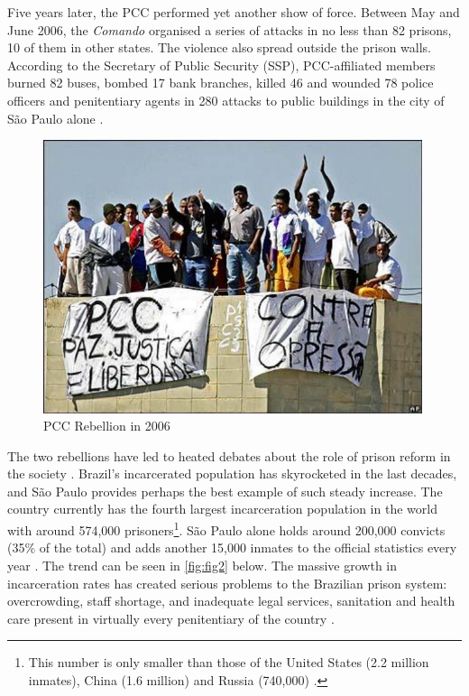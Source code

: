 Five years later, the PCC performed yet another show of force. Between May and June 2006, the \textit{Comando} organised a series of attacks in no less than 82 prisons, 10 of them in other states. The violence also spread outside the prison walls. According to the Secretary of Public Security (SSP), PCC-affiliated members burned 82 buses, bombed 17 bank branches, killed 46 and wounded 78 police officers and penitentiary agents in 280 attacks to public buildings in the city of S\~{a}o Paulo alone \citep[]{folha2006rebeliao, terra2008rebeliao}. 

\begin{center}
\begin{figure}[bth]
\includegraphics[height = 8cm, width = 1\linewidth]{gfx/fig1}
\caption[PCC Rebellion in 2006]{PCC Rebellion in 2006\footnotemark}
\label{fig:fig1}
\end{figure}
\end{center}

 The two rebellions have led to heated debates about the role of prison reform in the society \citep[323]{dias2009guerra}. Brazil's incarcerated population has skyrocketed in the last decades, and S\~{a}o Paulo provides perhaps the best example of such steady increase. The country currently has the fourth largest incarceration population in the world with around 574,000 prisoners\footnote{This number is only smaller than those of the United States (2.2 million inmates), China (1.6 million) and Russia (740,000) \citep{agenciabrasil2014prisaobrasil}.}. S\~{a}o Paulo alone holds around 200,000 convicts (35\% of the total) and adds another 15,000 inmates to the official statistics every year \citep{brasildefato2013numeropresos}. The trend can be seen in \autoref{fig:fig2} below. The massive growth in incarceration rates has created serious problems to the Brazilian prison system: overcrowding, staff shortage, and inadequate legal services, sanitation and health care present in virtually every penitentiary of the country \citep[275]{darke2013inmate}.

